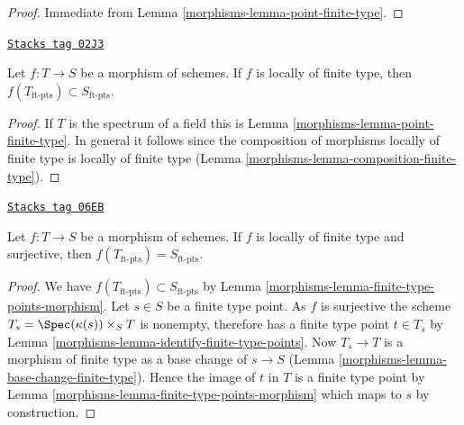 \begin{proof}

Immediate from Lemma \ref{morphisms-lemma-point-finite-type}.
\end{proof}

\begin{lemma}
\label{morphisms-lemma-finite-type-points-morphism}
\href{https://stacks.math.columbia.edu/tag/02J3}{\texttt{Stacks tag 02J3}}

Let $f : T \to S$ be a morphism of schemes.
If $f$ is locally of finite type, then
$f(T_{\text{ft-pts}}) \subset S_{\text{ft-pts}}$.
\end{lemma}

\begin{proof}

If $T$ is the spectrum of a field this is Lemma \ref{morphisms-lemma-point-finite-type}.
In general it follows since the composition of morphisms locally of finite
type is locally of finite type (Lemma \ref{morphisms-lemma-composition-finite-type}).
\end{proof}

\begin{lemma}
\label{morphisms-lemma-finite-type-points-surjective-morphism}
\href{https://stacks.math.columbia.edu/tag/06EB}{\texttt{Stacks tag 06EB}}

Let $f : T \to S$ be a morphism of schemes.
If $f$ is locally of finite type and surjective, then
$f(T_{\text{ft-pts}}) = S_{\text{ft-pts}}$.
\end{lemma}

\begin{proof}

We have $f(T_{\text{ft-pts}}) \subset S_{\text{ft-pts}}$ by
Lemma \ref{morphisms-lemma-finite-type-points-morphism}.
Let $s \in S$ be a finite type point. As $f$ is surjective the scheme
$T_s = \Spec(\kappa(s)) \times_S T$ is nonempty, therefore
has a finite type point $t \in T_s$ by
Lemma \ref{morphisms-lemma-identify-finite-type-points}.
Now $T_s \to T$ is a morphism of finite type as a base change
of $s \to S$
(Lemma \ref{morphisms-lemma-base-change-finite-type}).
Hence the image of $t$ in $T$ is a finite type point by
Lemma \ref{morphisms-lemma-finite-type-points-morphism}
which maps to $s$ by construction.
\end{proof}

